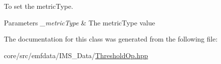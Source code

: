 To set the metricType. 


\begin{DoxyParams}{Parameters}
{\em \_\-metricType} & The metricType value \\
\hline
\end{DoxyParams}


The documentation for this class was generated from the following file:\begin{DoxyCompactItemize}
\item 
core/src/emfdata/IMS\_\-Data/\hyperlink{ThresholdOp_8hpp}{ThresholdOp.hpp}\end{DoxyCompactItemize}
